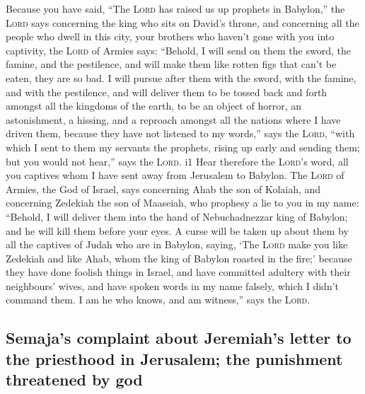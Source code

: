  Because you have said, ``The \textsc{Lord} has raised us
up prophets in Babylon,''  the \textsc{Lord} says
concerning the king who sits on David's throne, and concerning all the
people who dwell in this city, your brothers who haven't gone with you
into captivity,  the \textsc{Lord} of Armies says:
``Behold, I will send on them the sword, the famine, and the pestilence,
and will make them like rotten figs that can't be eaten, they are so
bad.  I will pursue after them with the sword, with the
famine, and with the pestilence, and will deliver them to be tossed back
and forth amongst all the kingdoms of the earth, to be an object of
horror, an astonishment, a hissing, and a reproach amongst all the
nations where I have driven them,  because they have not
listened to my words,'' says the \textsc{Lord}, ``with which I sent to
them my servants the prophets, rising up early and sending them; but you
would not hear,'' says the \textsc{Lord}. i1  Hear
therefore the \textsc{Lord}'s word, all you captives whom I have sent
away from Jerusalem to Babylon.  The \textsc{Lord} of
Armies, the God of Israel, says concerning Ahab the son of Kolaiah, and
concerning Zedekiah the son of Maaseiah, who prophesy a lie to you in my
name: ``Behold, I will deliver them into the hand of Nebuchadnezzar king
of Babylon; and he will kill them before your eyes.  A
curse will be taken up about them by all the captives of Judah who are
in Babylon, saying, `The \textsc{Lord} make you like Zedekiah and like
Ahab, whom the king of Babylon roasted in the fire;' 
because they have done foolish things in Israel, and have committed
adultery with their neighbours' wives, and have spoken words in my name
falsely, which I didn't command them. I am he who knows, and am
witness,'' says the \textsc{Lord}.

\hypertarget{semajas-complaint-about-jeremiahs-letter-to-the-priesthood-in-jerusalem-the-punishment-threatened-by-god}{%
\subsection{Semaja's complaint about Jeremiah's letter to the priesthood
in Jerusalem; the punishment threatened by
god}\label{semajas-complaint-about-jeremiahs-letter-to-the-priesthood-in-jerusalem-the-punishment-threatened-by-god}}

